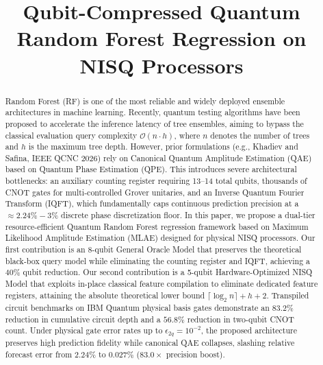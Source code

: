 \documentclass[conference]{IEEEtran}
\begin{document}
\title{Qubit-Compressed Quantum Random Forest Regression on NISQ Processors}

\author{
}

\maketitle

\begin{abstract}
Random Forest (RF) is one of the most reliable and widely deployed ensemble architectures in machine learning. Recently, quantum testing algorithms have been proposed to accelerate the inference latency of tree ensembles, aiming to bypass the classical evaluation query complexity $\mathcal{O}(n \cdot h)$, where $n$ denotes the number of trees and $h$ is the maximum tree depth. However, prior formulations (e.g., Khadiev and Safina, IEEE QCNC 2026) rely on Canonical Quantum Amplitude Estimation (QAE) based on Quantum Phase Estimation (QPE). This introduces severe architectural bottlenecks: an auxiliary counting register requiring 13--14 total qubits, thousands of CNOT gates for multi-controlled Grover unitaries, and an Inverse Quantum Fourier Transform (IQFT), which fundamentally caps continuous prediction precision at a $\approx 2.24\% - 3\%$ discrete phase discretization floor. In this paper, we propose a dual-tier resource-efficient Quantum Random Forest regression framework based on Maximum Likelihood Amplitude Estimation (MLAE) designed for physical NISQ processors. Our first contribution is an 8-qubit General Oracle Model that preserves the theoretical black-box query model while eliminating the counting register and IQFT, achieving a $40\%$ qubit reduction. Our second contribution is a 5-qubit Hardware-Optimized NISQ Model that exploits in-place classical feature compilation to eliminate dedicated feature registers, attaining the absolute theoretical lower bound $\lceil\log_2 n\rceil + h + 2$. Transpiled circuit benchmarks on IBM Quantum physical basis gates demonstrate an $83.2\%$ reduction in cumulative circuit depth and a $56.8\%$ reduction in two-qubit CNOT count. Under physical gate error rates up to $\epsilon_{2q} = 10^{-2}$, the proposed architecture preserves high prediction fidelity while canonical QAE collapses, slashing relative forecast error from $2.24\%$ to $0.027\%$ ($83.0\times$ precision boost).
\end{abstract}
\end{document}
